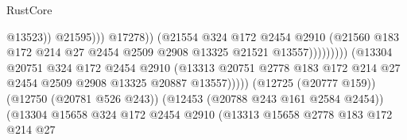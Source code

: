 \begin{lexlean}{RustCore}
\begin{coremodule}
                                                              @13523))
                                                          @21595)))
                                                    @17278))
                                                (@21554
                                                  @324
                                                  @172
                                                  @2454
                                                  @2910
                                                  (@21560
                                                    @183
                                                    @172
                                                    @214
                                                    @27
                                                    @2454
                                                    @2509
                                                    @2908
                                                    @13325
                                                    @21521
                                                    @13557)))))))))
                                  (@13304
                                    @20751
                                    @324
                                    @172
                                    @2454
                                    @2910
                                    (@13313
                                      @20751
                                      @2778
                                      @183
                                      @172
                                      @214
                                      @27
                                      @2454
                                      @2509
                                      @2908
                                      @13325
                                      @20887
                                      @13557)))))
                            (@12725 (@20777 @159))
                            (@12750 (@20781 @526 @243))
                            (@12453 (@20788 @243 @161 @2584 @2454))
                            (@13304
                              @15658
                              @324
                              @172
                              @2454
                              @2910
                              (@13313
                                @15658
                                @2778
                                @183
                                @172
                                @214
                                @27

\end{coremodule}
\end{lexlean}
